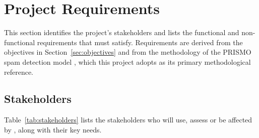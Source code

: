 \section{Project Requirements}\label{sec:requirements}

\newcommand{\must}{\textcolor{brandaccent}{\textbf{Must}}}
\newcommand{\should}{\textcolor{brandprimary}{\textbf{Should}}}
\newcommand{\could}{\textcolor{brandmuted}{\textbf{Could}}}
\newcommand{\reqgroup}[1]{\multicolumn{4}{@{}l}{\cellcolor{brandprimary!8}\textbf{\sffamily #1}} \\}

This section identifies the project's stakeholders and lists the functional and non-functional requirements that \projectname{} must satisfy. Requirements are derived from the objectives in Section~\ref{sec:objectives} and from the methodology of the PRISMO spam detection model \parencite{agrawal2018prismo}, which this project adopts as its primary methodological reference.

\subsection{Stakeholders}\label{sec:stakeholders}

Table~\ref{tab:stakeholders} lists the stakeholders who will use, assess or be affected by \projectname{}, along with their key needs.

